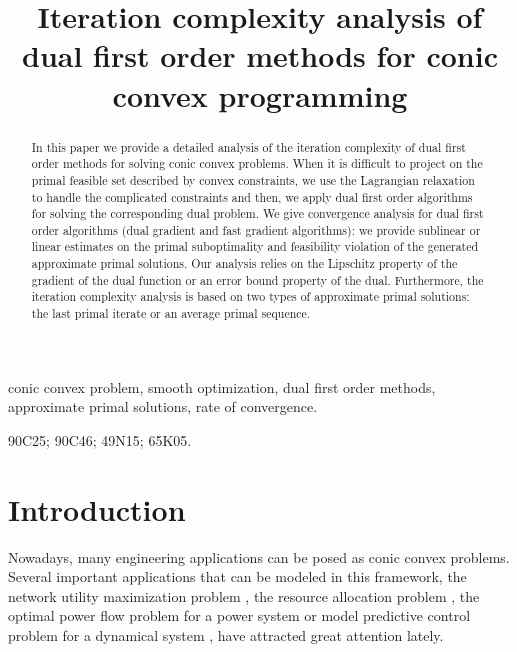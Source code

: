 \documentclass{gOMS2e}
\theoremstyle{plain}
\theoremstyle{definition}
\theoremstyle{remark}
\begin{document}

\title{Iteration complexity analysis of dual first order methods for
conic convex programming}

\author{
 }

\maketitle

\begin{abstract}
In this paper we provide a detailed analysis  of the iteration
complexity of dual first order methods for solving conic convex
problems. When it is difficult to project on the primal feasible set
described by convex constraints, we use the Lagrangian relaxation to
handle the complicated constraints and then, we apply dual first
order algorithms for solving the corresponding dual problem. We give
convergence analysis for dual first order algorithms (dual gradient
and fast gradient algorithms): we provide sublinear or linear
estimates on the primal suboptimality and feasibility violation of
the generated approximate primal solutions. Our analysis relies on
the Lipschitz property of the gradient of the dual function or an
error bound property of the dual. Furthermore, the iteration
complexity analysis is based on two types of approximate primal
solutions:  the last primal iterate or an average primal sequence.
\end{abstract}

\begin{keywords}
conic convex problem, smooth optimization, dual first order methods,
approximate primal solutions,  rate of convergence.
\end{keywords}

\begin{classcode}90C25; 90C46; 49N15; 65K05.
\end{classcode}

\section{Introduction}
\label{sec_introduction} Nowadays, many engineering applications can
be posed as  conic  convex problems.  Several
important applications that can be modeled in this framework,  the
network utility maximization  problem
\cite{BecNed:14,KelMau:98,WeiOzd:10}, the resource allocation
problem \cite{XiaBoy:06}, the optimal power flow problem for a power
system \cite{ZimMur:11} or model predictive control problem for a
dynamical system \cite{NecNed:13,NedNec:12,PatBem:12}, have
attracted great attention lately.
\end{document}
